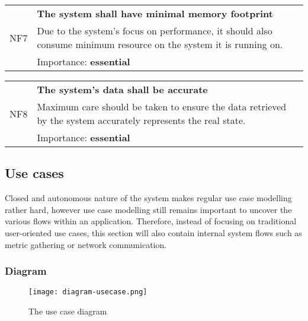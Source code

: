         \vspace{0.5cm}
        \noindent
        \begin{tabular}{ p{0.7cm}|p{14.5cm} }
            \multirow{3}{*}{NF7} & \textbf{The system shall have minimal memory footprint}\\
            \cline{2-2}
            & Due to the system's focus on performance, it should also consume minimum resource on the system it is running on.\\
            \cline{2-2}
            & Importance: \textbf{essential}
        \end{tabular}

        \vspace{0.5cm}
        \noindent
        \begin{tabular}{ p{0.7cm}|p{14.5cm} }
            \multirow{3}{*}{NF8} & \textbf{The system's data shall be accurate}\\
            \cline{2-2}
            & Maximum care should be taken to ensure the data retrieved by the system accurately represents the real state.\\
            \cline{2-2}
            & Importance: \textbf{essential}
        \end{tabular}
        
    \pagebreak
        
    \subsection{Use cases}
        Closed and autonomous nature of the system makes regular use case modelling rather hard, however use case modelling still remains important to uncover the various flows within an application. Therefore, instead of focusing on traditional user-oriented use cases, this section will also contain internal system flows such as metric gathering or network communication.
        
        \subsubsection{Diagram}
            \begin{center}
                \begin{figure}[!htb]
                    \texttt{[image: diagram-usecase.png]}
                    \caption{The use case diagram}
                    \label{fig:diagram-usecase}
                \end{figure}
            \end{center}

